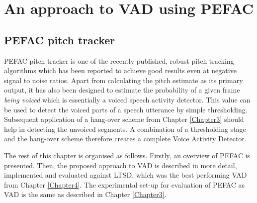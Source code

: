 
\chapter{An approach to VAD using PEFAC} %

\label{Chapter5} %



\section{PEFAC pitch tracker}

PEFAC pitch tracker \cite{PEFAC} is one of the recently published, robust pitch tracking algorithms which has been reported to achieve good results even at negative signal to noise ratios. Apart from calculating the pitch estimate as its primary output, it has also been designed to estimate the probability of a given frame \emph{being voiced} which is essentially a voiced speech activity detector. This value can be used to detect the voiced parts of a speech utterance by simple thresholding. Subsequent application of a hang-over scheme from Chapter \ref{Chapter3} should help in detecting the unvoiced segments. A combination of a thresholding stage and the hang-over scheme therefore creates a complete Voice Activity Detector.

The rest of this chapter is organised as follows. Firstly, an overview of PEFAC is presented. Then, the proposed approach to VAD is described in more detail, implemented and evaluated against LTSD, which was the best performing VAD from Chapter \ref{Chapter4}. The experimental set-up for evaluation of PEFAC as VAD is the same as described in Chapter \ref{Chapter3}.


